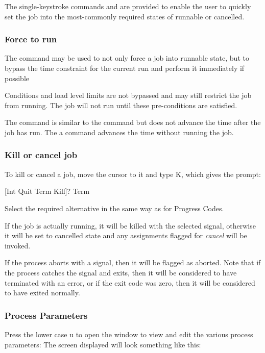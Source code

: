 The single-keystroke commands  and
 are provided to enable the user to quickly set
the job into the most-commonly required states of runnable or
cancelled.

\subsubsection{Force to run}
The  command may be used to not only force a job
into runnable state, but to bypass the time constraint for the current
run and perform it immediately if possible

Conditions and load level limits are not bypassed and may still restrict
the job from running. The job will not run until these pre-conditions
are satisfied.

The  command is similar to the
 command but does not advance the time after
the job has run. The a command advances the time without running the
job.

\subsubsection{Kill or cancel job}
To kill or cancel a job, move the cursor to it and type K, which gives
the prompt:

\begin{expara}

[Int Quit Term Kill]? Term

\end{expara}

Select the required alternative in the same way as for Progress Codes.

If the job is actually running, it will be killed with the selected
signal, otherwise it will be set to cancelled state and any assignments
flagged for \textit{cancel} will be invoked.

If the process aborts with a signal, then it will be flagged as aborted.
Note that if the process catches the signal and exits, then it will be
considered to have terminated with an error, or if the exit code was
zero, then it will be considered to have exited normally.

\subsubsection{Process Parameters}
Press the lower case u to open the window to view and edit the various
process parameters: The screen displayed will look something like this:


